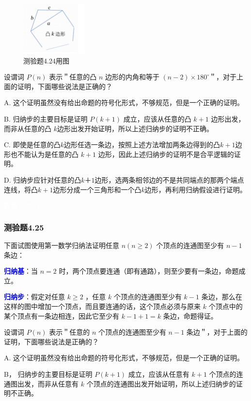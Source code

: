 \documentclass[UTF8, heading=true]{ctexart}
\begin{document}
\begin{figure}[H]
    \centering
    \includegraphics[width=0.3\textwidth]{4.24.jpg} %
    \caption{测验题4.24用图}
\end{figure}

设谓词 $P(n)$ 表示＂任意的凸 $n$ 边形的内角和等于 $(n-2) \times 180^{\circ}$＂，对于上面的证明，下面哪些说法是正确的？


A. 
这个证明虽然没有给出命题的符号化形式，不够规范，但是一个正确的证明。

B. 归纳步的主要目标是证明 $P(k+1)$ 成立，应该从任意的凸 $k+1$ 边形出发，而非从任意的凸 $k$边形出发开始证明，所以上述归纳步的证明不正确。

C. 
即使是任意的凸$k$边形任选一条边，按照上述方法增加两条边得到的凸$k+1$边形也不能认为是任意的凸 $k+1$ 边形，因此上述归纳步的证明不是合平逻辑的证明。

D.  
归纳步应针对任意的凸$k＋1$边形，选两条相邻边的不是共同端点的那两个端点连线，将凸$k+1$边形分成一个三角形和一个凸$k$边形，再利用归纳假设进行证明。

\textcolor{white}{答案：BCD}

\subsubsection{测验题4.25}

下面试图使用第一数学归纳法证明任意 $n(n \geq 2)$ 个顶点的连通图至少有 $n-1$ 条边：

\textcolor{blue}{\textbf{归纳基}}：当 $n=2$ 时，两个顶点要连通（即有通路），则至少要有一条边，命题成立。

\textcolor{blue}{\textbf{归纳步}}：假定对任意 $k \geq 2$ ，任意 $k$ 个顶点的连通图至少有 $k-1$ 条边，那么在这样的图中增加一个顶点，而且要连通的话，这个顶点必须与原来 $k$ 个顶点中的某个顶点有一条边相连，因此它至少有 $k-1+1=k$ 条边，命题得证。

设谓词 $P(n)$ 表示＂任意的 $n$ 个顶点的连通图至少有 $n-1$ 条边＂，对于上面的证明，下面哪些说法是正确的？

A. 这个证明虽然没有给出命题的符号化形式，不够规范，但是一个正确的证明。

B，
归纳步的主要目标是证明 $P(k+1)$ 成立，应该从任意有 $k+1$ 个顶点的连通图出发，而非从任意有 $k$ 个顶点的连通图出发开始证明，所以上述归纳步的证明不正确。
\end{document}

